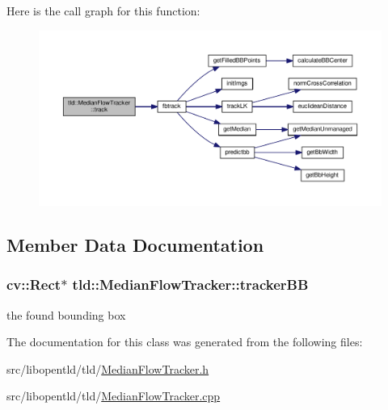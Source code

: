 Here is the call graph for this function\-:\nopagebreak
\begin{figure}[H]
\begin{center}
\leavevmode
\includegraphics[width=350pt]{classtld_1_1MedianFlowTracker_addcc103122a93f098583b8f9cf72e8ff_cgraph}
\end{center}
\end{figure}




\subsection{Member Data Documentation}
\hypertarget{classtld_1_1MedianFlowTracker_a254c6f56a5b4567357321acc5a36b844}{
\subsubsection[{tracker\-B\-B}]{\setlength{\rightskip}{0pt plus 5cm}cv\-::\-Rect$\ast$ tld\-::\-Median\-Flow\-Tracker\-::tracker\-B\-B}}\label{classtld_1_1MedianFlowTracker_a254c6f56a5b4567357321acc5a36b844}


the found bounding box 



The documentation for this class was generated from the following files\-:\begin{DoxyCompactItemize}
\item 
src/libopentld/tld/\hyperlink{MedianFlowTracker_8h}{Median\-Flow\-Tracker.\-h}\item 
src/libopentld/tld/\hyperlink{MedianFlowTracker_8cpp}{Median\-Flow\-Tracker.\-cpp}\end{DoxyCompactItemize}
